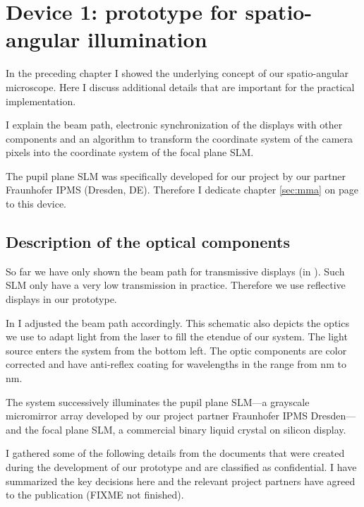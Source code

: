 
\chapter{Device 1: prototype for spatio-angular illumination}
\label{sec:dev1}
\begin{summary}
  In the preceding chapter I showed the underlying concept of our        
  spatio-angular microscope. Here I discuss additional details that
  are important for the practical implementation.

  I explain the beam path, electronic synchronization of the displays
  with other components and an algorithm to transform the coordinate
  system of the camera pixels into the coordinate system of the focal
  plane SLM.
  
  The pupil plane SLM was specifically developed for our project by    
  our partner Fraunhofer IPMS (Dresden, DE). Therefore I dedicate
  chapter \ref{sec:mma} on page \pageref{sec:mma} to this device.
\end{summary}
\section{Description of the optical components}
So far we have only shown the beam path for transmissive displays (in
). Such SLM only have a very low transmission
in practice. Therefore we use reflective displays in our prototype.

In  I adjusted the beam path accordingly. This
schematic also depicts the optics we use to adapt light from the laser
to fill the etendue of our system. The light source enters the system
from the bottom left. The optic components are color corrected and
have anti-reflex coating for wavelengths in the range from
\unit[400]{nm} to \unit[700]{nm}.

The system successively illuminates the pupil plane SLM---a grayscale
micromirror array developed by our project partner Fraunhofer IPMS
Dresden---and the focal plane SLM, a commercial binary liquid crystal
on silicon display.
 
I gathered some of the following details from the documents that were
created during the development of our prototype and are classified as
confidential. I have summarized the key decisions here and the
relevant project partners have agreed to the publication (FIXME not
finished).


